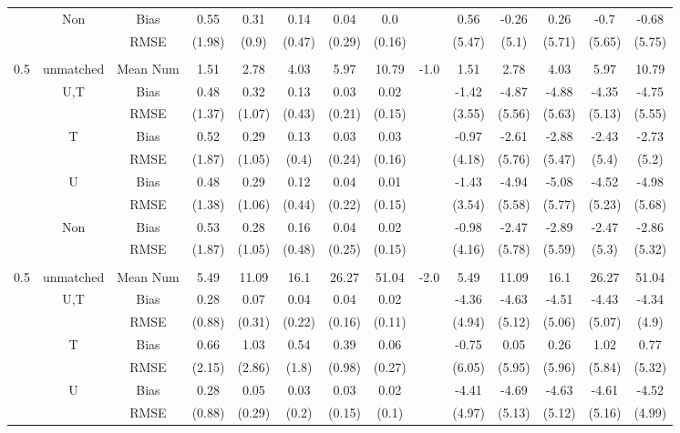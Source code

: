 \begin{tabular}{@{\extracolsep{5pt}}lc|cccccc|lccccc}
 & Non & Bias & 0.55 & 0.31 & 0.14 & 0.04 & 0.0 &  & 0.56 & -0.26 & 0.26 & -0.7 & -0.68 \\
 &  & RMSE & (1.98) & (0.9) & (0.47) & (0.29) & (0.16) &  & (5.47) & (5.1) & (5.71) & (5.65) & (5.75) \\
 &  &  &  &  &  &  &  &  &  &  &  &  &  \\
0.5 & unmatched & Mean Num & 1.51 & 2.78 & 4.03 & 5.97 & 10.79 & -1.0 & 1.51 & 2.78 & 4.03 & 5.97 & 10.79 \\
 & U,T & Bias & 0.48 & 0.32 & 0.13 & 0.03 & 0.02 &  & -1.42 & -4.87 & -4.88 & -4.35 & -4.75 \\
 &  & RMSE & (1.37) & (1.07) & (0.43) & (0.21) & (0.15) &  & (3.55) & (5.56) & (5.63) & (5.13) & (5.55) \\
 & T & Bias & 0.52 & 0.29 & 0.13 & 0.03 & 0.03 &  & -0.97 & -2.61 & -2.88 & -2.43 & -2.73 \\
 &  & RMSE & (1.87) & (1.05) & (0.4) & (0.24) & (0.16) &  & (4.18) & (5.76) & (5.47) & (5.4) & (5.2) \\
 & U & Bias & 0.48 & 0.29 & 0.12 & 0.04 & 0.01 &  & -1.43 & -4.94 & -5.08 & -4.52 & -4.98 \\
 &  & RMSE & (1.38) & (1.06) & (0.44) & (0.22) & (0.15) &  & (3.54) & (5.58) & (5.77) & (5.23) & (5.68) \\
 & Non & Bias & 0.53 & 0.28 & 0.16 & 0.04 & 0.02 &  & -0.98 & -2.47 & -2.89 & -2.47 & -2.86 \\
 &  & RMSE & (1.87) & (1.05) & (0.48) & (0.25) & (0.15) &  & (4.16) & (5.78) & (5.59) & (5.3) & (5.32) \\
 &  &  &  &  &  &  &  &  &  &  &  &  &  \\
0.5 & unmatched & Mean Num & 5.49 & 11.09 & 16.1 & 26.27 & 51.04 & -2.0 & 5.49 & 11.09 & 16.1 & 26.27 & 51.04 \\
 & U,T & Bias & 0.28 & 0.07 & 0.04 & 0.04 & 0.02 &  & -4.36 & -4.63 & -4.51 & -4.43 & -4.34 \\
 &  & RMSE & (0.88) & (0.31) & (0.22) & (0.16) & (0.11) &  & (4.94) & (5.12) & (5.06) & (5.07) & (4.9) \\
 & T & Bias & 0.66 & 1.03 & 0.54 & 0.39 & 0.06 &  & -0.75 & 0.05 & 0.26 & 1.02 & 0.77 \\
 &  & RMSE & (2.15) & (2.86) & (1.8) & (0.98) & (0.27) &  & (6.05) & (5.95) & (5.96) & (5.84) & (5.32) \\
 & U & Bias & 0.28 & 0.05 & 0.03 & 0.03 & 0.02 &  & -4.41 & -4.69 & -4.63 & -4.61 & -4.52 \\
 &  & RMSE & (0.88) & (0.29) & (0.2) & (0.15) & (0.1) &  & (4.97) & (5.13) & (5.12) & (5.16) & (4.99) \\

\end{tabular}
